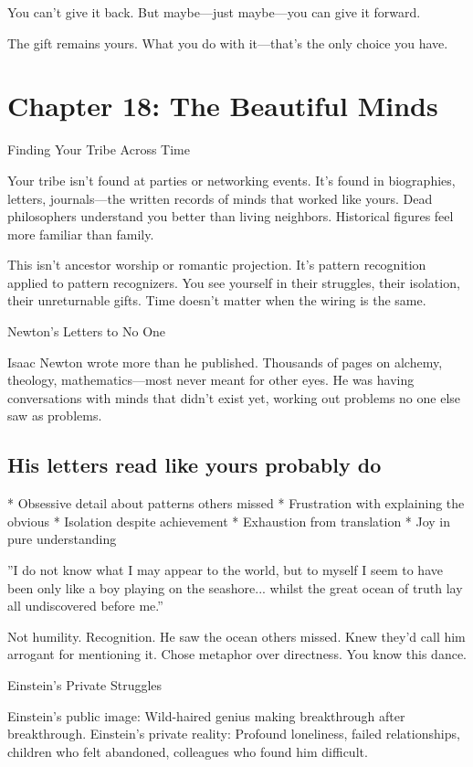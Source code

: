\documentclass[12pt,oneside]{book}
\begin{document}
You can't give it back. But maybe---just maybe---you can give it forward.

The gift remains yours. What you do with it---that's the only choice you have.

\chapter{Chapter 18: The Beautiful Minds}

Finding Your Tribe Across Time

Your tribe isn't found at parties or networking events. It's found in biographies, letters, journals---the written records of minds that worked like yours. Dead philosophers understand you better than living neighbors. Historical figures feel more familiar than family.

This isn't ancestor worship or romantic projection. It's pattern recognition applied to pattern recognizers. You see yourself in their struggles, their isolation, their unreturnable gifts. Time doesn't matter when the wiring is the same.

Newton's Letters to No One

Isaac Newton wrote more than he published. Thousands of pages on alchemy, theology, mathematics---most never meant for other eyes. He was having conversations with minds that didn't exist yet, working out problems no one else saw as problems.

\section{His letters read like yours probably do}

                    * Obsessive detail about patterns others missed
                    * Frustration with explaining the obvious
                    * Isolation despite achievement
                    * Exhaustion from translation
                    * Joy in pure understanding

''I do not know what I may appear to the world, but to myself I seem to have been only like a boy playing on the seashore... whilst the great ocean of truth lay all undiscovered before me.''

Not humility. Recognition. He saw the ocean others missed. Knew they'd call him arrogant for mentioning it. Chose metaphor over directness. You know this dance.

Einstein's Private Struggles

Einstein's public image: Wild-haired genius making breakthrough after breakthrough. Einstein's private reality: Profound loneliness, failed relationships, children who felt abandoned, colleagues who found him difficult.
\end{document}
